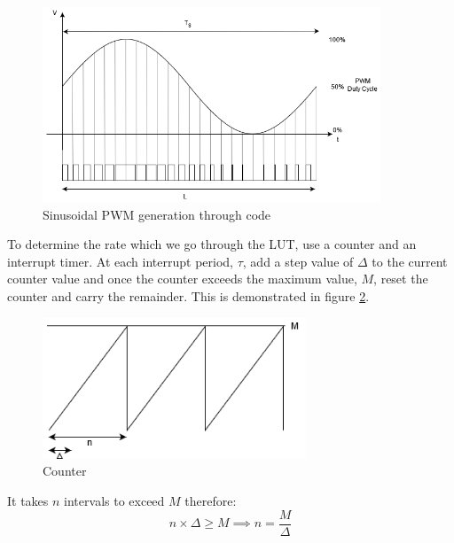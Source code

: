 \documentclass[12pt, a4paper]{article}
\begin{document}
\begin{figure} [!htb]
	\hfill\includegraphics[width=0.9\textwidth]{./Figures/Sinusoidal_PWM}\hspace{\fill}
	\caption{Sinusoidal PWM generation through code}
	\label{fig:sinusoidalPWM}
\end{figure}

To determine the rate which we go through the LUT, use a counter and an interrupt timer. At each interrupt period, $\tau$, add a step value of $\Delta$ to the current counter value and once the counter exceeds the maximum value, $M$, reset the counter and carry the remainder. This is demonstrated in figure \ref{fig:sinusoidalPWMCounter}. 
\begin{figure} [!htb]
	\hfill\includegraphics[width=0.7\textwidth]{./Figures/Counter}\hspace{\fill}
	\caption{Counter}
	\label{fig:sinusoidalPWMCounter}
\end{figure}

It takes $n$ intervals to exceed $M$ therefore:
\begin{equation}
	n\times\Delta \ge M \implies n = \frac{M}{\Delta}
	\label{eqn:M/D}
\end{equation}
\end{document}
